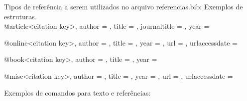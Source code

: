 Tipos de referência a serem utilizados no arquivo referencias.bib:
Exemplos de estruturas.\\

@article{<citation key>,
    author        = {},
    title         = {},
    journaltitle  = {},
    year          = {}
}

@online{<citation key>,
    author        = {},
    title         = {},
    year          = {},
    url           = {},
    urlaccessdate = {}
}

@book{<citation key>,
    author        = {},
    title         = {},
    year          = {}
}

@misc{<citation key>,
    author        = {},
    title         = {},
    year          = {},
    url           = {},
    urlaccessdate = {}
}


Exemplos de comandos para texto e referências:

